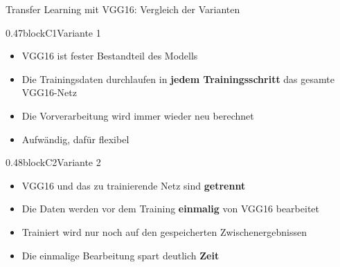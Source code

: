\begin{frame}{Transfer Learning mit VGG16: Vergleich der Varianten}
\small 
\begin{blockrow}
\begin{blockcol}{0.47\textwidth}{blockC1}{\small Variante 1}
\begin{itemize}
  \item VGG16 ist fester Bestandteil des Modells
  \item Die Trainingsdaten durchlaufen in \textbf{jedem Trainingsschritt} das gesamte VGG16-Netz
  \item Die Vorverarbeitung wird immer wieder neu berechnet
  \item Aufwändig, dafür flexibel
\end{itemize}
\end{blockcol}
\begin{blockcol}{0.48\textwidth}{blockC2}{\small Variante 2}
\begin{itemize}
  \item VGG16 und das zu trainierende Netz sind \textbf{getrennt}
  \item Die Daten werden vor dem Training \textbf{einmalig} von VGG16 bearbeitet
  \item Trainiert wird nur noch auf den gespeicherten Zwischenergebnissen
  \item Die einmalige Bearbeitung spart deutlich \textbf{Zeit}
\end{itemize}
\end{blockcol}
\end{blockrow}
\end{frame}



